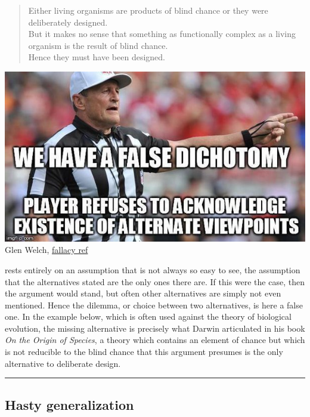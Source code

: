 \documentclass[justified]{tufte-book}
\newenvironment{argument}{\begin{quote}\normalsize}{\end{quote}}
\begin{document}
\begin{argument}
Either living organisms are products of blind chance or they were
deliberately designed.\\
But it makes no sense that something as functionally complex as a living
organism is the result of blind chance.\\
Hence they must have been designed.
\end{argument}

\begin{marginfigure}
\includegraphics{img/fallacies/dichotomy.jpg}\\
Glen Welch, \href{https://twitter.com/fallacy_ref?lang=en}{fallacy ref}
\end{marginfigure}

 rests entirely on an assumption that is not always so easy to see, the assumption that the alternatives stated are the only ones there are. If this were the case, then the argument would stand, but often other alternatives are simply not even mentioned. Hence the dilemma, or choice between two alternatives, is here a false one. In the example below, which is often used against the theory of biological evolution, the missing alternative is precisely what Darwin articulated in his book \emph{On the Origin of Species}, a theory which contains an element of chance but which is not reducible to the blind chance that this argument presumes is the only alternative to deliberate design.

\begin{center}\rule{0.5\linewidth}{\linethickness}\end{center}

\hypertarget{hasty-generalization}{%
\subsection*{Hasty generalization}\label{hasty-generalization}}
\end{document}
